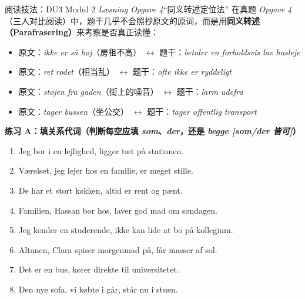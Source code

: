 \begin{grammatikbox}{阅读技法：DU3 Modul 2 \textit{Læsning Opgave 4}“同义转述定位法”}
在真题 \textit{Opgave 4}（三人对比阅读）中，题干几乎不会照抄原文的原词，而是用\textbf{同义转述（Parafrasering）}来考察是否真正读懂：
\begin{itemize}
  \item 原文：\textit{ikke er så høj}（房租不高） $\leftrightarrow$ 题干：\textit{betaler en forholdsvis lav husleje}
  \item 原文：\textit{ret rodet}（相当乱） $\leftrightarrow$ 题干：\textit{ofte ikke er ryddeligt}
  \item 原文：\textit{støjen fra gaden}（街上的噪音） $\leftrightarrow$ 题干：\textit{larm udefra}
  \item 原文：\textit{tager bussen}（坐公交） $\leftrightarrow$ 题干：\textit{tager offentlig transport}
\end{itemize}
\end{grammatikbox}


\textbf{练习 A：填关系代词（判断每空应填 \textit{som}、\textit{der}，还是 \textit{begge [som/der 皆可]}）}
\begin{enumerate}
  \item Jeg bor i en lejlighed, \underline{\hspace{2.2cm}} ligger tæt på stationen.
  \item Værelset, \underline{\hspace{2.2cm}} jeg lejer hos en familie, er meget stille.
  \item De har et stort køkken, \underline{\hspace{2.2cm}} altid er rent og pænt.
  \item Familien, \underline{\hspace{2.2cm}} Hassan bor hos, laver god mad om søndagen.
  \item Jeg kender en studerende, \underline{\hspace{2.2cm}} ikke kan lide at bo på kollegium.
  \item Altanen, \underline{\hspace{2.2cm}} Clara spiser morgenmad på, får masser af sol.
  \item Det er en bus, \underline{\hspace{2.2cm}} kører direkte til universitetet.
  \item Den nye sofa, \underline{\hspace{2.2cm}} vi købte i går, står nu i stuen.
\end{enumerate}

